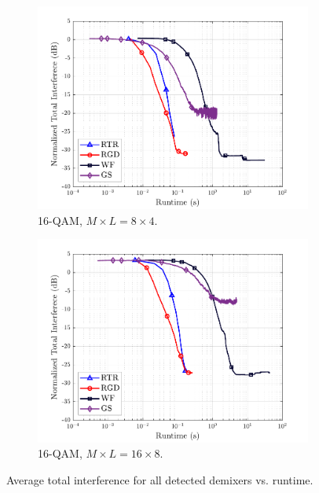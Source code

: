 \begin{figure}[ht]
\begin{subfigure}{0.48\linewidth}
		\centering
		\includegraphics[width=0.95\linewidth]{./figs/rocma_figs/ROCMA_MSR_TI_QgSt_runtime_16QAM_L=4_M=8_J=4_nSim_100.pdf}
		\caption{16-QAM, $M\times L = 8\times4$.}\label{rocma:fig:CMA_ROCMA_runtime_8x4_16qam}
	\end{subfigure}
	\begin{subfigure}{0.48\linewidth}
		\centering
		\includegraphics[width=0.95\linewidth]{./figs/rocma_figs/ROCMA_MSR_TI_QgSt_runtime_16QAM_L=8_M=16_J=8_nSim_100.pdf}
		\caption{16-QAM, $M\times L = 16\times8$.}\label{rocma:fig:CMA_ROCMA_runtime_16x8_16qam}		
	\end{subfigure}
	\caption{Average total interference for all detected demixers vs. runtime.}
	\label{rocma:fig:CMA_ROCMA_runtime}
\end{figure}


